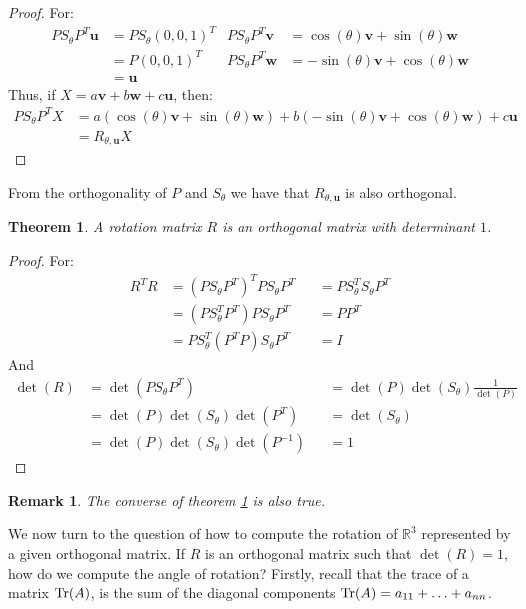 \documentclass{article}
\theoremstyle{mystyle}
\newtheorem{theorem}{Theorem}[section]
\newtheorem{remark}{Remark}[section]
\begin{document}
\begin{proof}
For:
\begin{align*}
    PS_{\theta}P^T\mathbf{u} &= PS_{\theta} (0,0,1)^{T} & PS_{\theta}P^{T}\mathbf{v} &= \cos(\theta)\mathbf{v}+\sin(\theta) \mathbf{w}\\
    &= P(0,0,1)^{T} & PS_{\theta}P^{T} \mathbf{w} &= -\sin(\theta) \mathbf{v}+\cos(\theta) \mathbf{w}\\
    &= \mathbf{u}
\end{align*}
Thus, if $X = a\mathbf{v}+b\mathbf{w}+c\mathbf{u}$, then:
\begin{align*}
    PS_{\theta}P^TX &= a(\cos(\theta)\mathbf{v}+\sin(\theta)\mathbf{w})+b(-\sin(\theta) \mathbf{v}+\cos(\theta)\mathbf{w})+c\mathbf{u}\\
    &= R_{\theta,\mathbf{u}}X
\end{align*}
\end{proof}
From the orthogonality of $P$ and $S_{\theta}$ we have that $R_{\theta,\mathbf{u}}$ is also orthogonal.
\begin{theorem}
\label{theorem:LINEAR_ALGEBRA_a_rotation_matrix_is_an_orthoganal_matrix_with_determinant_1}
A rotation matrix $R$ is an orthogonal matrix with determinant $1$.
\end{theorem}
\begin{proof}
For:
\begin{align*}
    R^{T}R &= (PS_{\theta}P^{T})^{T}PS_{\theta}P^{T} & &=PS_{\theta}^{T}S_{\theta}P^{T}\\
    &= (PS_{\theta}^{T}P^{T})PS_{\theta}P^{T} & &= PP^{T}\\
    &= PS_{\theta}^{T}(P^{T}P)S_{\theta}P^{T} & &= I
\end{align*}
And
\begin{align*}
    \det(R) &= \det(PS_{\theta}P^T) & &=\det(P)\det(S_{\theta})\frac{1}{\det(P)}\\
    &= \det(P)\det(S_{\theta})\det(P^T) & &= \det(S_{\theta})\\
    &= \det(P)\det(S_{\theta})\det(P^{-1}) & &= 1
\end{align*}
\end{proof}
\begin{remark}
The converse of theorem \ref{theorem:LINEAR_ALGEBRA_a_rotation_matrix_is_an_orthoganal_matrix_with_determinant_1} is also true.
\end{remark}
We now turn to the question of how to compute the rotation of $\mathbb{R}^3$ represented by a given orthogonal matrix. If $R$ is an orthogonal matrix such that $\det(R) = 1$, how do we compute the angle of rotation? Firstly, recall that the trace of a matrix $\Tr(A)$, is the sum of the diagonal components $\Tr(A) = a_{11}+\hdots + a_{nn}$.
\end{document}
